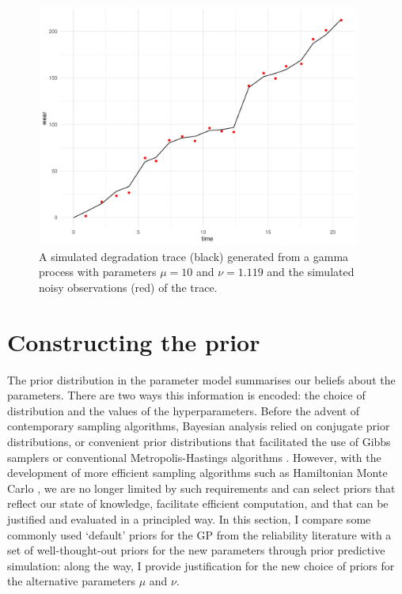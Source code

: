 \begin{figure}
  \centering
  \includegraphics[width=0.95\textwidth]{./figures/ch-4/SimData.pdf}
  \caption{A simulated degradation trace (black) generated from a gamma process with parameters $\mu = 10$ and $\nu = 1.119$ and the simulated noisy observations (red) of the trace.}
  \label{fig:sim-data}
\end{figure}

\section{Constructing the prior} \label{sec:GP_priors}

The prior distribution in the parameter model summarises our beliefs about the parameters. There are two ways this information is encoded: the choice of distribution and the values of the hyperparameters. Before the advent of contemporary sampling algorithms, Bayesian analysis relied on conjugate prior distributions, or convenient prior distributions that facilitated the use of Gibbs samplers or conventional Metropolis-Hastings algorithms \citep{gilks_1996}. However, with the development of more efficient sampling algorithms such as Hamiltonian Monte Carlo \citep{betancourt_2017}, we are no longer limited by such requirements and can select priors that reflect our state of knowledge, facilitate efficient computation, and that can be justified and evaluated in a principled way. In this section, I compare some commonly used `default' priors for the GP from the reliability literature with a set of well-thought-out priors for the new parameters through prior predictive simulation: along the way, I provide justification for the new choice of priors for the alternative parameters $\mu$ and $\nu$.

